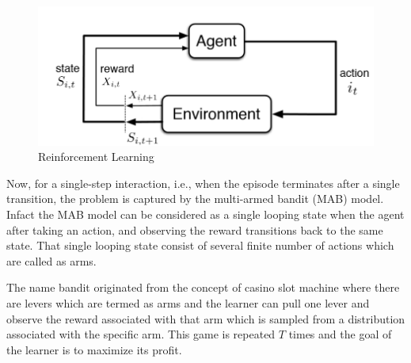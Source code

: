 \begin{figure}[!th]
\begin{center}
\includegraphics[scale=0.3]{synopsis/img/RL1.png}
\caption{Reinforcement Learning}
\label{fig:rl}
\end{center}
\end{figure}

Now, for a single-step interaction, i.e., when the episode terminates after a single transition, the problem is captured by the multi-armed bandit (MAB) model. Infact the MAB model can be considered as a single looping state when the agent after taking an action, and observing the reward transitions back to the same state. That single looping state consist of several finite number of actions which are called as arms.

	The name bandit originated from the concept of casino slot machine where there are levers which are termed as arms and the learner can pull one lever and observe the reward associated with that arm which is sampled from a distribution associated with the specific arm. This game is repeated $T$ times and the goal of the learner is to maximize its profit. 
	
    
    

